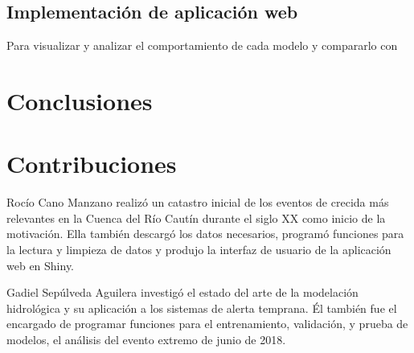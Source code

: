 \documentclass[hess, manuscript]{copernicus}
\begin{document}
\subsection{Implementación de aplicación web}
Para visualizar y analizar el comportamiento de cada modelo y compararlo con
\clearpage
\section{Conclusiones}
\label{sec:Conclusiones}

\section{Contribuciones}
\label{Contribuciones}

Rocío Cano Manzano realizó un catastro inicial de los eventos de crecida más relevantes en la Cuenca del Río Cautín durante el siglo XX como inicio de la motivación. Ella también descargó los datos necesarios, programó funciones para la lectura y limpieza de datos y produjo la interfaz de usuario de la aplicación web en Shiny.

Gadiel Sepúlveda Aguilera investigó el estado del arte de la modelación hidrológica y su aplicación a los sistemas de alerta temprana. Él también fue el encargado de programar funciones para el entrenamiento, validación, y prueba de modelos, el análisis del evento extremo de junio de 2018.

\break







\end{document}

